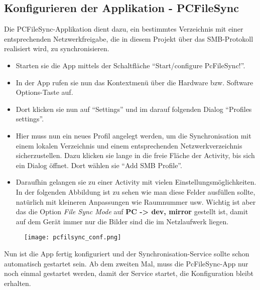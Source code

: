 \begin{flushleft}
  \subsection{Konfigurieren der Applikation - PCFileSync}
  Die PCFileSync-Applikation dient dazu, ein bestimmtes Verzeichnis mit einer entsprechenden Netzwerkfreigabe, die in diesem Projekt über das SMB-Protokoll realisiert wird, zu synchronisieren.
    \begin{itemize}
      \item Starten sie die App mittels der Schaltfläche ``Start/configure PcFileSync!''.
      \item In der App rufen sie nun das Kontextmenü über die Hardware bzw. Software Options-Taste auf.
      \item Dort klicken sie nun auf ``Settings'' und im darauf folgenden Dialog ``Profiles settings''.
      \item Hier muss nun ein neues Profil angelegt werden, um die Synchronisation mit einem lokalen Verzeichnis und einem entsprechenden Netzwerkverzeichnis sicherzustellen. Dazu klicken sie lange in die freie Fläche der Activity, bis sich ein Dialog öffnet. Dort wählen sie ``Add SMB Profile''.
      \item Daraufhin gelangen sie zu einer Activity mit vielen Einstellungsmöglichkeiten. In der folgenden Abbildung ist zu sehen wie man diese Felder ausfüllen sollte, natürlich mit kleineren Anpassungen wie Raumnummer usw. Wichtig ist aber das die Option \textit{File Sync Mode} auf \textbf{PC -> dev, mirror} gestellt ist, damit auf dem Gerät immer nur die Bilder sind die im Netzlaufwerk liegen.
      \end{itemize}
      \begin{figure}[htb]
        \centering
        \texttt{[image: pcfilsync\_conf.png]}\\ %
      \end{figure}
      Nun ist die App fertig konfiguriert und der Synchronisation-Service sollte schon automatisch gestartet sein.
      Ab dem zweiten Mal, muss die PcFileSync-App nur noch einmal gestartet werden, damit der Service startet, die Konfiguration bleibt erhalten.    

\end{flushleft}
